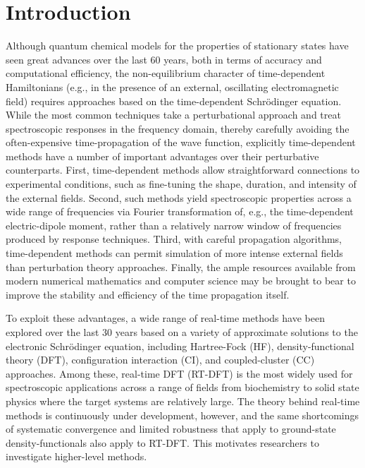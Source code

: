 \section{Introduction} \label{intro}

Although quantum chemical models for the properties of stationary states have
seen great advances over the last 60 years, both in terms of accuracy and
computational efficiency, the non-equilibrium character of time-dependent
Hamiltonians (e.g., in the presence of an external, oscillating
electromagnetic field) requires approaches based on the time-dependent
Schr\"odinger equation.\cite{McCullough1969, Kosloff1988, Li2020}
While the most common techniques take a perturbational approach and treat
spectroscopic responses in the frequency domain, thereby carefully avoiding
the often-expensive time-propagation of the wave function, explicitly
time-dependent methods have a number of important advantages over their
perturbative counterparts. First, time-dependent methods allow straightforward
connections to experimental conditions, such as fine-tuning the shape,
duration, and intensity of the external fields.  Second, such methods yield
spectroscopic properties across a wide range of frequencies via Fourier
transformation of, e.g., the time-dependent electric-dipole moment, rather
than a relatively narrow window of frequencies produced by response
techniques.  Third, with careful propagation algorithms, time-dependent
methods can permit simulation of more intense external fields than
perturbation theory approaches.  Finally, the ample resources available from
modern numerical mathematics and computer science may be brought to bear to
improve the stability and efficiency of the time propagation itself.

To exploit these advantages, a wide range of real-time methods have been
explored over the last 30 years based on a variety of approximate solutions to
the electronic Schr\"odinger equation, including Hartree-Fock
(HF)\cite{Li2005}, density-functional theory (DFT),\cite{Repisky2015, Goings2018}
configuration interaction (CI),\cite{Klamroth2003,Schlegel2007} and
coupled-cluster (CC)\cite{Huber2011, Nascimento2017, Kristiansen2020}
approaches.  Among these, real-time DFT (RT-DFT) is the most widely used for
spectroscopic applications across a range of fields from biochemistry to solid
state physics where the target systems are relatively large.\cite{Sanchez2010,
Kolesov2016, Provorse2016, Bruner2016, Goings2016} The theory behind real-time
methods is continuously under development, however, and the same shortcomings
of systematic convergence and limited robustness that apply to ground-state
density-functionals also apply to RT-DFT.  This motivates researchers to
investigate higher-level methods.

